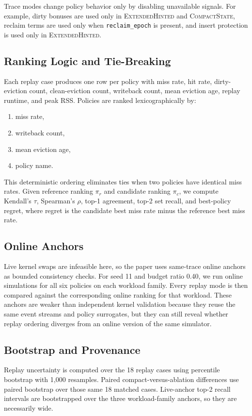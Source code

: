 \documentclass{article}
\newcommand{\traceext}{\textsc{ExtendedHinted}}
\newcommand{\tracecompact}{\textsc{CompactState}}
\begin{document}
Trace modes change policy behavior only by disabling unavailable signals. For example, dirty bonuses are used only in \traceext{} and \tracecompact{}, reclaim terms are used only when \texttt{reclaim\_epoch} is present, and insert protection is used only in \traceext{}.

\subsection{Ranking Logic and Tie-Breaking}
Each replay case produces one row per policy with miss rate, hit rate, dirty-eviction count, clean-eviction count, writeback count, mean eviction age, replay runtime, and peak RSS. Policies are ranked lexicographically by:
\begin{enumerate}
  \item miss rate,
  \item writeback count,
  \item mean eviction age,
  \item policy name.
\end{enumerate}

This deterministic ordering eliminates ties when two policies have identical miss rates. Given reference ranking $\pi_r$ and candidate ranking $\pi_c$, we compute Kendall's $\tau$, Spearman's $\rho$, top-1 agreement, top-2 set recall, and best-policy regret, where regret is the candidate best miss rate minus the reference best miss rate.

\subsection{Online Anchors}
Live kernel swaps are infeasible here, so the paper uses same-trace online anchors as bounded consistency checks. For seed 11 and budget ratio 0.40, we run online simulations for all six policies on each workload family. Every replay mode is then compared against the corresponding online ranking for that workload. These anchors are weaker than independent kernel validation because they reuse the same event streams and policy surrogates, but they can still reveal whether replay ordering diverges from an online version of the same simulator.

\subsection{Bootstrap and Provenance}
Replay uncertainty is computed over the 18 replay cases using percentile bootstrap with 1{,}000 resamples. Paired compact-versus-ablation differences use paired bootstrap over those same 18 matched cases. Live-anchor top-2 recall intervals are bootstrapped over the three workload-family anchors, so they are necessarily wide.
\end{document}
